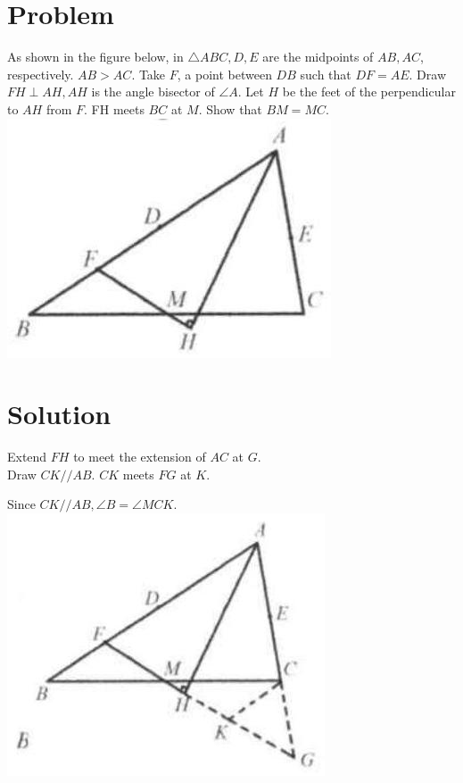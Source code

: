 \documentclass{article}
\begin{document}
\section*{Problem}
As shown in the figure below, in \(\triangle A B C, D, E\) are the midpoints of \(A B, A C\), respectively. \(A B>A C\). Take \(F\), a point between \(D B\) such that \(D F=A E\). Draw \(F H \perp A H, A H\) is the angle bisector of \(\angle A\). Let \(H\) be the feet of the perpendicular to \(A H\) from \(F\). FH meets \(B C\) at \(M\). Show that \(B M=M C\).\\
\centering
\includegraphics[width=\textwidth]{images/064(2).jpg}

\section*{Solution}
Extend \(F H\) to meet the extension of \(A C\) at \(G\).\\
Draw \(C K / / A B\). \(C K\) meets \(F G\) at \(K\).

Since \(C K / / A B, \angle B=\angle M C K\).\\
\centering
\includegraphics[width=\textwidth]{images/068.jpg}
\end{document}

